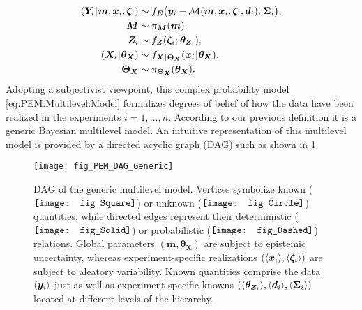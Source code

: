 \begin{subequations} \label{eq:PEM:Multilevel:Model}
  \begin{align}
    (\bm{Y}_i \cond \bm{m},\bm{x}_i,\bm{\zeta}_i) &\sim f_{\bm{E}} \big( \bm{y}_i-\mathcal{M}(\bm{m},\bm{x}_i,\bm{\zeta}_i,\bm{d}_i) \distparam \bm{\Sigma}_i \big), \label{eq:PEM:Multilevel:Model:Data}\\
    \bm{M} &\sim \pi_{\bm{M}} (\bm{m}), \label{eq:PEM:Multilevel:Model:ParametricPriorM}\\
    \bm{Z}_i &\sim f_{\bm{Z}}(\bm{\zeta}_i \distparam \bm{\theta}_{\bm{Z}_i}), \label{eq:PEM:Multilevel:Model:StructuralPriorZ}\\
    (\bm{X}_i \cond \bm{\theta}_{\bm{X}}) &\sim f_{\bm{X} \cond \bm{\Theta}_{\bm{X}}} (\bm{x}_i \cond \bm{\theta}_{\bm{X}}), \label{eq:PEM:Multilevel:Model:StructuralPriorX}\\
    \bm{\Theta}_{\bm{X}} &\sim \pi_{\bm{\Theta}_{\bm{X}}} (\bm{\theta}_{\bm{X}}). \label{eq:PEM:Multilevel:Model:ParametricPriorThetaX}
  \end{align}
\end{subequations}
Adopting a subjectivist viewpoint, this complex probability model \cref{eq:PEM:Multilevel:Model} formalizes degrees of belief of how the data have been realized in the experiments \(i=1,\ldots,n\).
According to our previous definition it is a generic Bayesian multilevel model.
An intuitive representation of this multilevel model is provided by a directed acyclic graph (DAG) \cite{Bayesian:Koski2009,Bayesian:Kjaerulff2013} such as shown in \cref{fig:PEM:Multilevel:DAG}.
\begin{figure}[ht]
  \centering
  \texttt{[image: fig\_PEM\_DAG\_Generic]}
  \caption[DAG of the generic multilevel model]{DAG of the generic multilevel model.
           Vertices symbolize known (\(\vcenter{\hbox{\protect\texttt{[image: fig\_Square]}}}\))
           or unknown (\(\vcenter{\hbox{\protect\texttt{[image: fig\_Circle]}}}\)) quantities,
           while directed edges represent their deterministic (\(\vcenter{\hbox{\protect\texttt{[image: fig\_Solid]}}}\))
           or probabilistic (\(\vcenter{\hbox{\protect\texttt{[image: fig\_Dashed]}}}\)) relations.
           Global parameters \((\bm{m},\bm{\theta}_{\bm{X}})\) are subject to epistemic uncertainty,
           whereas experiment-specific realizations \((\langle{\bm{x}_i}\rangle,\langle{\bm{\zeta}_i}\rangle)\) are subject to aleatory variability.
           Known quantities comprise the data \(\langle{\bm{y}_i}\rangle\) just as well as experiment-specific knowns
           \((\langle{\bm{\theta}_{\bm{Z}_i}}\rangle,\langle{\bm{d}_i}\rangle,\langle{\bm{\Sigma}_i}\rangle)\) located at different levels of the hierarchy.
          }
  \label{fig:PEM:Multilevel:DAG}
\end{figure}